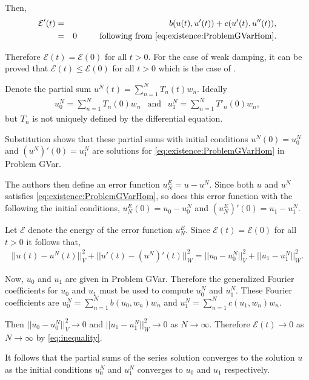 		Then,
		\begin{eqnarray*}
			\mathcal{E}'(t) & = & b(u(t), u'(t)) + c(u'(t), u''(t)),\\
							& = & 0 \ \ \ \ \ \ \ \textrm{ following from \eqref{eq:existence:ProblemGVarHom}}. 
		\end{eqnarray*}

		Therefore $\mathcal{E}(t) = \mathcal{E}(0)$ for all $t>0$. For the case of weak damping, it can be proved that $\mathcal{E}(t) \leq \mathcal{E}(0)$ for all $t>0$ which is the case of \cite{CVV18}.

		Denote the partial sum $u^{N}(t) = \sum_{n=1}^{N} T_{n}(t)w_n$. Ideally
		\begin{eqnarray*}
			u_0^{N} = \sum_{n=1}^{N} T_n(0) w_n \ \ \textrm{ and } \ \ u_{1}^{N} =\sum_{n=1}^{N} T'_n(0) w_n,
		\end{eqnarray*}
		but $T_n$ is not uniquely defined by the differential equation.

		Substitution shows that these partial sums with initial conditions $u^N(0) = u^N_0$ and $(u^N)'(0) = u^N_1$ are solutions for \eqref{eq:existence:ProblemGVarHom} in Problem GVar.

		The authors then define an error function $u^E_N = u - u^N$. Since both $u$ and $u^N$ satisfies \eqref{eq:existence:ProblemGVarHom}, so does this error function with the following the initial conditions, $u^E_N(0) = u_0 - u^N_0$ and $(u^E_N)'(0) = u_1 - u^N_1$.

		Let $\mathcal{E}$ denote the energy of the error function $u^E_N$. Since $\mathcal{E}(t) = \mathcal{E}(0)$ for all $t>0$ it follows that, 
		\begin{eqnarray}
			||u(t) -  u^N(t)||_V^2 + ||u'(t) - (u^N)'(t)||^2_W = ||u_0 - u^N_0||_V^2 + ||u_1 - u^N_1||_W^2. \label{eq:inequality}
		\end{eqnarray}

		Now, $u_0$ and $u_1$ are given in Problem GVar. Therefore the generalized Fourier coefficients for $u_0$ and $u_1$ must be used to compute $u_0^N$ and $u_1^N$. These Fourier coefficients are $\displaystyle u_0^N = \sum_{n=1}^{N} b(u_0, w_n)w_n$ and $\displaystyle u_1^N = \sum_{n=1}^{N} c(u_1, w_n)w_n$.

		Then $||u_0 - u^N_0||_V^2 \rightarrow 0$ and $||u_1 - u^N_1||_W^2 \rightarrow 0$ as $N \rightarrow \infty$. Therefore $\mathcal{E}(t) \rightarrow 0$ as $N \rightarrow \infty$ by \eqref{eq:inequality}.

		It follows that the partial sums of the series solution converges to the solution $u$ as the initial conditions $u_0^N$ and $u_1^N$ converges to $u_0$ and $u_1$ respectively.


